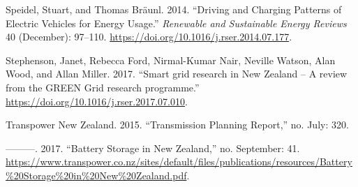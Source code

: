 \documentclass[]{article}
\begin{document}
\leavevmode\hypertarget{ref-speidel_driving_2014}{}%
Speidel, Stuart, and Thomas Bräunl. 2014. ``Driving and Charging Patterns of Electric Vehicles for Energy Usage.'' \emph{Renewable and Sustainable Energy Reviews} 40 (December): 97--110. \url{https://doi.org/10.1016/j.rser.2014.07.177}.

\leavevmode\hypertarget{ref-Stephenson2017}{}%
Stephenson, Janet, Rebecca Ford, Nirmal-Kumar Nair, Neville Watson, Alan Wood, and Allan Miller. 2017. ``Smart grid research in New Zealand -- A review from the GREEN Grid research programme.'' \url{https://doi.org/10.1016/j.rser.2017.07.010}.

\leavevmode\hypertarget{ref-TranspowerNZ2015}{}%
Transpower New Zealand. 2015. ``Transmission Planning Report,'' no. July: 320.

\leavevmode\hypertarget{ref-TranspowerNewZealand2017}{}%
---------. 2017. ``Battery Storage in New Zealand,'' no. September: 41. \url{https://www.transpower.co.nz/sites/default/files/publications/resources/Battery\%20Storage\%20in\%20New\%20Zealand.pdf}.
\end{document}
